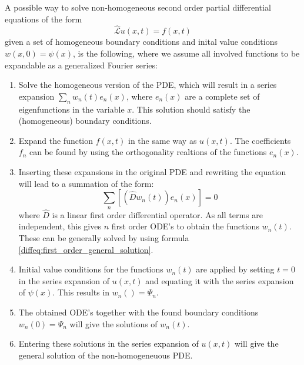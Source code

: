     \begin{method}
		A possible way to solve non-homogeneous second order partial differential equations of the form
        \[
        	\hat{\mathcal{L}}u(x, t) = f(x, t)
        \]
        given a set of homogeneous boundary conditions and inital value conditions $w(x, 0) = \psi(x)$, is the following, where we assume all involved functions to be expandable as a generalized Fourier series:
        \begin{enumerate}
			\item Solve the homogeneous version of the PDE, which will result in a series expansion $\sum_nw_n(t)e_n(x)$, where $e_n(x)$ are a complete set of eigenfunctions in the variable $x$. This solution should satisfy the (homogeneous\footnotemark) boundary conditions.
            \item Expand the function $f(x, t)$ in the same way as $u(x, t)$. The coefficients $f_n$ can be found by using the orthogonality realtions of the functions $e_n(x)$.
            \item Inserting these expansions in the original PDE and rewriting the equation will lead to a summation of the form:
            \[
            	\sum_n\left[\left(\hat{D}w_n(t)\right)e_n(x)\right] = 0
            \]
            where $\hat{D}$ is a linear first order differential operator. As all terms are independent, this gives $n$ first order ODE's to obtain the functions $w_n(t)$. These can be generally solved by using formula \ref{diffeq:first_order_general_solution}.
            \item Initial value conditions for the functions $w_n(t)$ are applied by setting $t=0$ in the series expansion of $u(x, t)$ and equating it with the series expansion of $\psi(x)$. This results in $w_n() = \Psi_n$.
            \item The obtained ODE's together with the found boundary conditions $w_n(0) = \Psi_n$ will give the solutions of $w_n(t)$.
            \item Entering these solutions in the series expansion of $u(x, t)$ will give the general solution of the non-homogeneuous PDE.
		\end{enumerate}
	\end{method}
